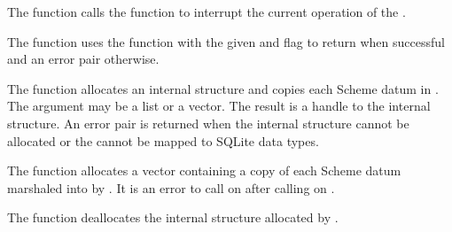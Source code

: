 The  function calls the
 function to interrupt the current operation
of the .

\begin{function}
\end{function}

The  function uses the
 function with the given  and
 flag to return 
when successful and an error pair otherwise.

\begin{function}
\end{function}

The  function allocates an internal
structure and copies each Scheme datum in . The
 argument may be a list or a vector. The result is a
handle to the internal structure.
An error pair is returned when the internal structure cannot be allocated or the
 cannot be mapped to SQLite data types.

\begin{function}
\end{function}

The  function allocates a vector
containing a copy of each Scheme datum marshaled into 
by .
It is an error to call  on 
after calling  on .

\begin{function}
\end{function}

The  function deallocates the internal
structure allocated by .

\begin{function}
\end{function}

